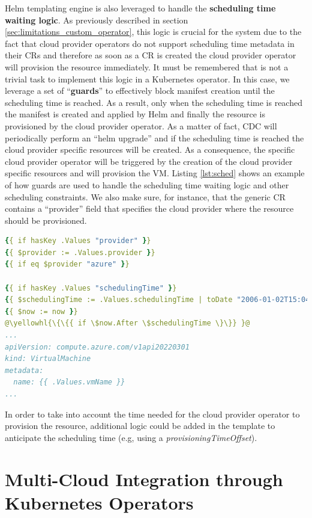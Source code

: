 Helm templating engine is also leveraged to handle the \textbf{scheduling time waiting logic}.
As previously described in section \ref{sec:limitations_custom_operator}, this logic is crucial for the system due to the fact that cloud provider operators do not support scheduling time metadata in their CRs and therefore as soon as a CR is created the cloud provider operator will provision the resource immediately.
It must be remembered that is not a trivial task to implement this logic in a Kubernetes operator.
In this case, we leverage a set of ``\textbf{guards}'' to effectively block manifest creation until the scheduling time is reached. 
As a result, only when the scheduling time is reached the manifest is created and applied by Helm and finally the resource is provisioned by the cloud provider operator.
As a matter of fact, CDC will periodically perform an ``helm upgrade'' and if the scheduling time is reached the cloud provider specific resources will be created. 
As a consequence, the specific cloud provider operator will be triggered by the creation of the cloud provider specific resources and will provision the VM.
Listing \ref{lst:sched} shows an example of how guards are used to handle the scheduling time waiting logic and other scheduling constraints.
We also make sure, for instance, that the generic CR contains a ``provider'' field that specifies the cloud provider where the resource should be provisioned.

\begin{lstlisting}[language=yaml, caption={Scheduling time}, label={lst:sched}]
{{ if hasKey .Values "provider" }}
{{ $provider := .Values.provider }}
{{ if eq $provider "azure" }}

{{ if hasKey .Values "schedulingTime" }}
{{ $schedulingTime := .Values.schedulingTime | toDate "2006-01-02T15:04:05Z" }}
{{ $now := now }}
@\yellowhl{\{\{{ if \$now.After \$schedulingTime \}\}} }@
...
apiVersion: compute.azure.com/v1api20220301
kind: VirtualMachine
metadata:
  name: {{ .Values.vmName }}
...
\end{lstlisting}

In order to take into account the time needed for the cloud provider operator to provision the resource, additional logic could be added in the template to anticipate the scheduling time (e.g, using a \textit{provisioningTimeOffset}).

\section{Multi-Cloud Integration through Kubernetes Operators}
\label{sec:cloud_providers_operators}

